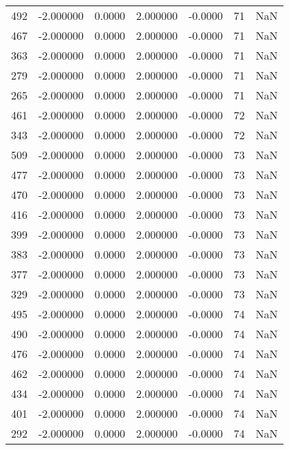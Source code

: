 \begin{tabular}{rrrrrrr}
492 &   -2.000000 &    0.0000 &    2.000000 &     -0.0000 &          71 & NaN \\
467 &   -2.000000 &    0.0000 &    2.000000 &     -0.0000 &          71 & NaN \\
363 &   -2.000000 &    0.0000 &    2.000000 &     -0.0000 &          71 & NaN \\
279 &   -2.000000 &    0.0000 &    2.000000 &     -0.0000 &          71 & NaN \\
265 &   -2.000000 &    0.0000 &    2.000000 &     -0.0000 &          71 & NaN \\
461 &   -2.000000 &    0.0000 &    2.000000 &     -0.0000 &          72 & NaN \\
343 &   -2.000000 &    0.0000 &    2.000000 &     -0.0000 &          72 & NaN \\
509 &   -2.000000 &    0.0000 &    2.000000 &     -0.0000 &          73 & NaN \\
477 &   -2.000000 &    0.0000 &    2.000000 &     -0.0000 &          73 & NaN \\
470 &   -2.000000 &    0.0000 &    2.000000 &     -0.0000 &          73 & NaN \\
416 &   -2.000000 &    0.0000 &    2.000000 &     -0.0000 &          73 & NaN \\
399 &   -2.000000 &    0.0000 &    2.000000 &     -0.0000 &          73 & NaN \\
383 &   -2.000000 &    0.0000 &    2.000000 &     -0.0000 &          73 & NaN \\
377 &   -2.000000 &    0.0000 &    2.000000 &     -0.0000 &          73 & NaN \\
329 &   -2.000000 &    0.0000 &    2.000000 &     -0.0000 &          73 & NaN \\
495 &   -2.000000 &    0.0000 &    2.000000 &     -0.0000 &          74 & NaN \\
490 &   -2.000000 &    0.0000 &    2.000000 &     -0.0000 &          74 & NaN \\
476 &   -2.000000 &    0.0000 &    2.000000 &     -0.0000 &          74 & NaN \\
462 &   -2.000000 &    0.0000 &    2.000000 &     -0.0000 &          74 & NaN \\
434 &   -2.000000 &    0.0000 &    2.000000 &     -0.0000 &          74 & NaN \\
401 &   -2.000000 &    0.0000 &    2.000000 &     -0.0000 &          74 & NaN \\
292 &   -2.000000 &    0.0000 &    2.000000 &     -0.0000 &          74 & NaN \\

\end{tabular}
